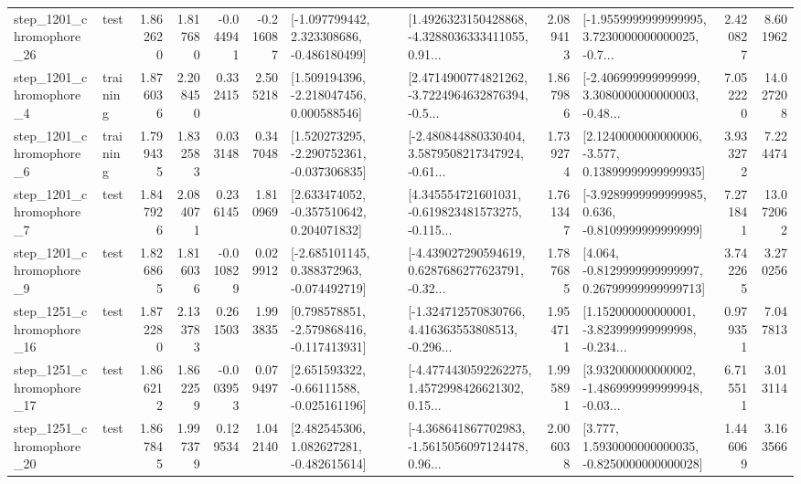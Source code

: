 \begin{tabular}{llrrrrllrlrr}
 step\_1201\_chromophore\_26 &      test &      1.862620 &    1.817680 &     -0.044941 & -0.216087 &   [-1.097799442, 2.323308686, -0.486180499] &  [1.4926323150428868, -4.3288036333411055, 0.91... &       2.089413 &  [-1.9559999999999995, 3.7230000000000025, -0.7... &            2.420827 &          8.601962 \\
  step\_1201\_chromophore\_4 &  training &      1.876036 &    2.208450 &      0.332415 &  2.505218 &    [1.509194396, -2.218047456, 0.000588546] &  [2.4714900774821262, -3.7224964632876394, -0.5... &       1.867986 &  [-2.406999999999999, 3.3080000000000003, -0.48... &            7.052220 &         14.027208 \\
  step\_1201\_chromophore\_6 &  training &      1.799435 &    1.832583 &      0.033148 &  0.347048 &   [1.520273295, -2.290752361, -0.037306835] &  [-2.480844880330404, 3.5879508217347924, -0.61... &       1.739274 &  [2.1240000000000006, -3.577, 0.13899999999999935] &            3.933272 &          7.224474 \\
  step\_1201\_chromophore\_7 &      test &      1.847926 &    2.084071 &      0.236145 &  1.810969 &    [2.633474052, -0.357510642, 0.204071832] &  [4.345554721601031, -0.619823481573275, -0.115... &       1.761347 &  [-3.9289999999999985, 0.636, -0.8109999999999999] &            7.271841 &         13.072062 \\
  step\_1201\_chromophore\_9 &      test &      1.826865 &    1.816036 &     -0.010829 &  0.029912 &   [-2.685101145, 0.388372963, -0.074492719] &  [-4.439027290594619, 0.6287686277623791, -0.32... &       1.787685 &  [4.064, -0.8129999999999997, 0.26799999999999713] &            3.742265 &          3.270256 \\
 step\_1251\_chromophore\_16 &      test &      1.872280 &    2.133783 &      0.261503 &  1.993835 &   [0.798578851, -2.579868416, -0.117413931] &  [-1.324712570830766, 4.416363553808513, -0.296... &       1.954711 &  [1.152000000000001, -3.823999999999998, -0.234... &            0.979351 &          7.047813 \\
 step\_1251\_chromophore\_17 &      test &      1.866212 &    1.862259 &     -0.003953 &  0.079497 &    [2.651593322, -0.66111588, -0.025161196] &  [-4.4774430592262275, 1.4572998426621302, 0.15... &       1.995891 &  [3.932000000000002, -1.4869999999999948, -0.03... &            6.715511 &          3.013114 \\
 step\_1251\_chromophore\_20 &      test &      1.867845 &    1.997379 &      0.129534 &  1.042140 &    [2.482545306, 1.082627281, -0.482615614] &  [-4.368641867702983, -1.5615056097124478, 0.96... &       2.006038 &   [3.777, 1.5930000000000035, -0.8250000000000028] &            1.446069 &          3.163566 \\

\end{tabular}

